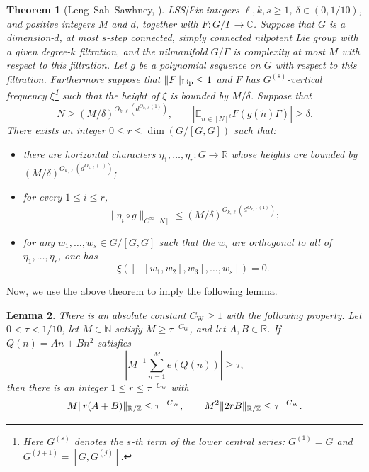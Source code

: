 \documentclass[twoside]{aomart}
\theoremstyle{paperplain}
\newtheorem{theorem}{Theorem}[section]
\newtheorem{lemma}[theorem]{Lemma}
\theoremstyle{paperdefinition}
\newcommand{\Z}{\mathbb Z}
\newcommand{\N}{\mathbb N}
\newcommand{\R}{\mathbb R}
\numberwithin{equation}{section}
\begin{document}
\newcommand{\LSSTheoremCitation}{\cite[Theorem~5.2]{LSS}}
\begin{theorem}[Leng--Sah--Sawhney, \LSSTheoremCitation]\label{sc:LSS-5.2}
Fix integers $\ell,k,s\ge1$, $\delta\in(0,1/10)$, and positive integers
$M$ and $d$, together with $F:G/\Gamma\to\mathbb C$. Suppose that $G$ is a dimension-$d$, at most
$s$-step connected, simply connected nilpotent Lie group with a given
degree-$k$ filtration, and the nilmanifold $G/\Gamma$ is complexity at
most $M$ with respect to this filtration. Let $g$ be a polynomial
sequence on $G$ with respect to this filtration. Furthermore suppose
that $\|F\|_{\rm Lip}\le1$ and $F$ has $G^{(s)}$-vertical frequency $\xi$\footnote{Here $G^{(s)}$ denotes the $s$-th term of the lower central series: $G^{(1)}=G$ and $G^{(j+1)}=[G,G^{(j)}]$.}
such that the height of $\xi$ is bounded by $M/\delta$. Suppose that
\[
 N\ge (M/\delta)^{O_{k,\ell}(d^{O_{k,\ell}(1)})},
 \qquad
 \left|\mathbb E_{\widetilde n\in[N]^\ell}
 F(g(\widetilde n)\Gamma)\right|\ge\delta.
\]
There exists an integer $0\le r\le\dim(G/[G,G])$ such that:
\begin{itemize}
\item there are horizontal characters $\eta_1,\ldots,\eta_r:G\to\mathbb R$
whose heights are bounded by
$(M/\delta)^{O_{k,\ell}(d^{O_{k,\ell}(1)})}$;
\item for every $1\le i\le r$,
\[
 \|\eta_i\circ g\|_{C^\infty[N]}
 \le (M/\delta)^{O_{k,\ell}(d^{O_{k,\ell}(1)})};
\]
\item for any $w_1,\ldots,w_s\in G/[G,G]$ such that the $w_i$ are
orthogonal to all of $\eta_1,\ldots,\eta_r$, one has
\[
 \xi([[[w_1,w_2],w_3],\ldots,w_s])=0.
\]
\end{itemize}
\end{theorem}

Now, we use the above theorem to imply the following lemma.

\begin{lemma}\label{sc:circle-lemma}
There is an absolute constant $C_{\mathrm W}\ge1$ with the following
property. Let $0<\tau<1/10$, let $M\in\N$ satisfy
$M\ge\tau^{-C_{\mathrm W}}$, and let $A,B\in\R$.
If $Q(n)=An+Bn^2$ satisfies
\begin{equation*}
 \left|M^{-1}\sum_{n=1}^M e(Q(n))\right|\ge\tau,
\end{equation*}
then there is an integer $1\le r\le\tau^{-C_{\mathrm W}}$ with
\begin{equation}
 M\|r(A+B)\|_{\R/\Z}\le\tau^{-C_{\rm W}},\qquad
 M^2\|2rB\|_{\R/\Z}\le\tau^{-C_{\rm W}}.
\label{sc:circle-output}
\end{equation}
\end{lemma}
\end{document}
